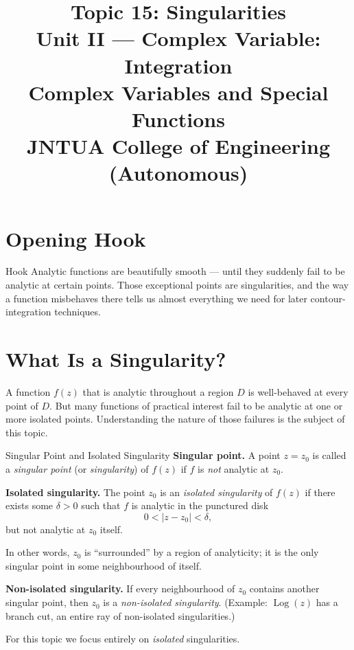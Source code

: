 \documentclass[12pt,a4paper]{article}
\title{\textbf{Topic 15: Singularities}\\[6pt]
       \large Unit II --- Complex Variable: Integration\\[4pt]
       \normalsize Complex Variables and Special Functions\\
       JNTUA College of Engineering (Autonomous)}
\author{}
\date{}
\begin{document}
\maketitle
\tableofcontents
\newpage

\section{Opening Hook}
\begin{curiositybox}{Hook}
Analytic functions are beautifully smooth --- until they suddenly fail to be analytic at certain
points. Those exceptional points are singularities, and the way a function misbehaves there tells
us almost everything we need for later contour-integration techniques.
\end{curiositybox}

\section{What Is a Singularity?}

A function $f(z)$ that is analytic throughout a region $D$ is well-behaved at every point of $D$.
But many functions of practical interest fail to be analytic at one or more isolated points.
Understanding the nature of those failures is the subject of this topic.

\begin{infobox}{Singular Point and Isolated Singularity}
\textbf{Singular point.}
A point $z = z_0$ is called a \emph{singular point} (or \emph{singularity}) of $f(z)$ if $f$ is
\emph{not} analytic at $z_0$.

\textbf{Isolated singularity.}
The point $z_0$ is an \emph{isolated singularity} of $f(z)$ if there exists some $\delta > 0$ such
that $f$ is analytic in the punctured disk
\[
  0 < |z - z_0| < \delta,
\]
but not analytic at $z_0$ itself.

In other words, $z_0$ is ``surrounded'' by a region of analyticity; it is the only singular point
in some neighbourhood of itself.

\textbf{Non-isolated singularity.}
If every neighbourhood of $z_0$ contains another singular point, then $z_0$ is a
\emph{non-isolated singularity}. (Example: $\operatorname{Log}(z)$ has a branch cut, an entire
ray of non-isolated singularities.)

For this topic we focus entirely on \emph{isolated} singularities.
\end{infobox}
\end{document}
